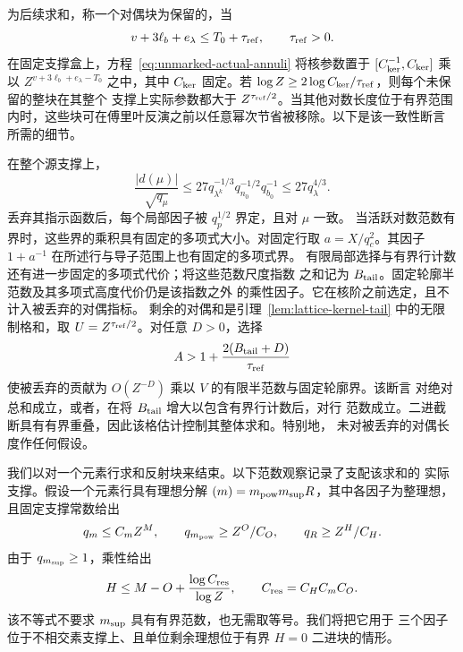 \documentclass[11pt,a4paper]{article}
\numberwithin{equation}{section}
\numberwithin{figure}{section}
\theoremstyle{definition}
\theoremstyle{remark}
\begin{document}
为后续求和，称一个对偶块为保留的，当
\[
 v+3\ell_b+e_\lambda\le T_0+\tau_{\rm ref},
 \qquad \tau_{\rm ref}>0.
\]
在固定支撑盒上，方程~\eqref{eq:unmarked-actual-annuli} 将核参数置于
$[C_{\rm ker}^{-1},C_{\rm ker}]$ 乘以
$Z^{v+3\ell_b+e_\lambda-T_0}$ 之中，其中 $C_{\rm ker}$ 固定。若
$\log Z\ge2\log C_{\rm ker}/\tau_{\rm ref}$，则每个未保留的整块在其整个
支撑上实际参数都大于 $Z^{\tau_{\rm ref}/2}$。当其他对数长度位于有界范围
内时，这些块可在傅里叶反演之前以任意幂次节省被移除。以下是该一致性断言
所需的细节。

在整个源支撑上，
\[
 \frac{|d(\mu)|}{\sqrt{q_\mu}}
 \le27q_{\lambda^k}^{-1/3}q_{n_0}^{-1/2}q_{b_0}^{-1}
 \le27q_\lambda^{4/3}.
\]
丢弃其指示函数后，每个局部因子被 $q_p^{1/2}$ 界定，且对 $\mu$ 一致。
当活跃对数范数有界时，这些界的乘积具有固定的多项式大小。对固定行取
$a=X/q_c^2$。其因子 $1+a^{-1}$ 在所述行与导子范围上也有固定的多项式界。
有限局部选择与有界行计数还有进一步固定的多项式代价；将这些范数尺度指数
之和记为 $B_{\rm tail}$。固定轮廓半范数及其多项式高度代价仍是该指数之外
的乘性因子。它在核阶之前选定，且不计入被丢弃的对偶指标。
剩余的对偶和是引理~\ref{lem:lattice-kernel-tail} 中的无限制格和，取
$U=Z^{\tau_{\rm ref}/2}$。对任意 $D>0$，选择
\[
 A>1+\frac{2(B_{\rm tail}+D)}{\tau_{\rm ref}}
\]
使被丢弃的贡献为 $O(Z^{-D})$ 乘以 $V$ 的有限半范数与固定轮廓界。该断言
对绝对总和成立，或者，在将 $B_{\rm tail}$ 增大以包含有界行计数后，对行
范数成立。二进截断具有有界重叠，因此该格估计控制其整体求和。特别地，
未对被丢弃的对偶长度作任何假设。

我们以对一个元素行求和反射块来结束。以下范数观察记录了支配该求和的
实际支撑。假设一个元素行具有理想分解
$(m)=m_{\rm pow}m_{\rm sup}R$，其中各因子为整理想，且固定支撑常数给出
\[
 q_m\le C_mZ^M,\qquad q_{m_{\rm pow}}\ge Z^O/C_O,
 \qquad q_R\ge Z^H/C_H.
\]
由于 $q_{m_{\rm sup}}\ge1$，乘性给出
\begin{equation}\label{eq:actual-residual-row-dyad}
 H\le M-O+\frac{\log C_{\rm res}}{\log Z},
 \qquad C_{\rm res}=C_HC_mC_O.
\end{equation}
该不等式不要求 $m_{\rm sup}$ 具有有界范数，也无需取等号。我们将把它用于
三个因子位于不相交素支撑上、且单位剩余理想位于有界 $H=0$ 二进块的情形。
\end{document}
